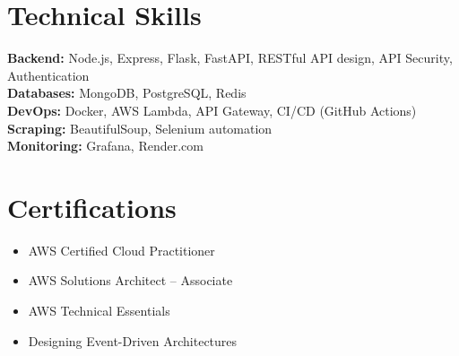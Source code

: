 \documentclass[letterpaper,11pt]{article}
\newcommand{\resumeItem}[1]{\item\small{#1\vspace{-2pt}}}
\newcommand{\resumeSubHeadingListStart}{\begin{itemize}[leftmargin=0.15in,label={}]}
\newcommand{\resumeSubHeadingListEnd}{\end{itemize}}
\begin{document}
\section{Technical Skills}
\begin{itemize}[leftmargin=0.15in,label={}]
  \small{\item{
    \textbf{Backend:} Node.js, Express, Flask, FastAPI, RESTful API design, API Security, Authentication\\
    \textbf{Databases:} MongoDB, PostgreSQL, Redis\\
    \textbf{DevOps:} Docker, AWS Lambda, API Gateway, CI/CD (GitHub Actions)\\
    \textbf{Scraping:} BeautifulSoup, Selenium automation\\
    \textbf{Monitoring:} Grafana, Render.com
  }}
\end{itemize}

\section{Certifications}
\resumeSubHeadingListStart
  \resumeItem{AWS Certified Cloud Practitioner}
  \resumeItem{AWS Solutions Architect -- Associate}
  \resumeItem{AWS Technical Essentials}
  \resumeItem{Designing Event-Driven Architectures}
\resumeSubHeadingListEnd
\end{document}
